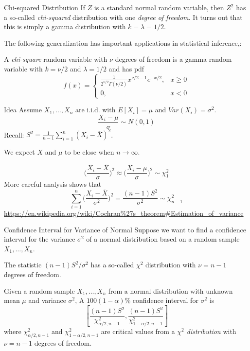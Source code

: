 \documentclass[t,handout]{beamer}
\begin{document}
\begin{frame}{Chi-squared Distribution}
    If $Z$ is a standard normal random variable, then $Z^2$ has a so-called \textit{chi-squared} distribution with one \textit{degree of freedom}. It turns out that this is simply a gamma distribution with $k=\lambda=1/2$.
    
    \vspace{.2cm}
    The following generalization has important applications in statistical inference,:
    \begin{block}{}
    A \emph{chi-square} random variable with $\nu$ degrees of freedom is a gamma random variable with $k=\nu/2$ and $\lambda=1/2$ and has pdf
    $$f(x) = \begin{cases}\frac1{2^{\nu/2}\Gamma(\nu/2)}x^{\nu/2-1}e^{-x/2},& x\geq 0 \\ 0, & x<0\end{cases}$$
    \end{block}
    \end{frame}

\begin{frame}{Idea}
    Assume $X_1,\ldots,X_n$ are i.i.d. with $E[X_i]=\mu$ and $Var(X_i)=\sigma^2$.
    $$\frac{X_i - \mu}{\sigma}\sim N(0,1)$$
    Recall: $S^2 = \frac{1}{n-1} \sum_{i=1}^n (X_i - \overline{X})^2 $.

    We expect $\overline{X}$ and $\mu$ to be close when $n\to \infty$.

    $$\bigg( \frac{X_i - \overline{X}}{\sigma} \bigg)^2 \approx \bigg( \frac{X_i - \mu}{\sigma} \bigg)^2 \sim \chi^2_{1}$$
    More careful analysis shows that 
    $$ \sum_{i=1}^n \bigg(  \frac{ X_i - \overline{X}}{\sigma^2} \bigg)^2 = \frac{(n-1)S^2}{\sigma^2} \sim \chi^2_{n-1}$$
    \url{https://en.wikipedia.org/wiki/Cochran\%27s_theorem\#Estimation_of_variance}
    \end{frame}

\begin{frame}{Confidence Interval for Variance of Normal}
    Suppose we want to find a confidence interval for the variance $\sigma^2$ of a normal distribution based on a random sample $X_1,\dots,X_n$.
    
    \pause \vspace{.2cm}
    The statistic $(n-1)S^2/\sigma^2$ has a so-called $\chi^2$ distribution with $\nu=n-1$ degrees of freedom.
    
    \pause \begin{block}{}
    Given a random sample $X_1,\dots,X_n$ from a normal distribution with unknown mean $\mu$ and variance $\sigma^2$,
    A $100(1-\alpha)\%$ confidence interval for $\sigma^2$ is
    $$\left[\frac{(n-1)S^2}{\chi^2_{\alpha/2,n-1}}, \frac{(n-1)S^2}{\chi^2_{1-\alpha/2,n-1}}\right]$$
    where $\chi^2_{\alpha/2,n-1}$ and $\chi^2_{1-\alpha/2,n-1}$ are critical values from a \emph{$\chi^2$ distribution} with $\nu=n-1$ degrees of freedom.
    \end{block}
    \end{frame}
    
\end{document}
